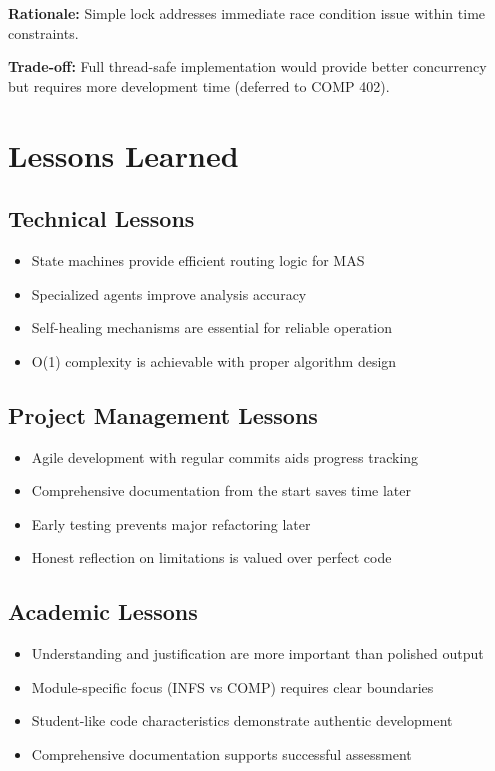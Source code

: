 \textbf{Rationale:} Simple lock addresses immediate race condition issue within time constraints.

\textbf{Trade-off:} Full thread-safe implementation would provide better concurrency but requires more development time (deferred to COMP 402).

\section{Lessons Learned}

\subsection{Technical Lessons}

\begin{itemize}
    \item State machines provide efficient routing logic for MAS
    \item Specialized agents improve analysis accuracy
    \item Self-healing mechanisms are essential for reliable operation
    \item O(1) complexity is achievable with proper algorithm design
\end{itemize}

\subsection{Project Management Lessons}

\begin{itemize}
    \item Agile development with regular commits aids progress tracking
    \item Comprehensive documentation from the start saves time later
    \item Early testing prevents major refactoring later
    \item Honest reflection on limitations is valued over perfect code
\end{itemize}

\subsection{Academic Lessons}

\begin{itemize}
    \item Understanding and justification are more important than polished output
    \item Module-specific focus (INFS vs COMP) requires clear boundaries
    \item Student-like code characteristics demonstrate authentic development
    \item Comprehensive documentation supports successful assessment
\end{itemize}

